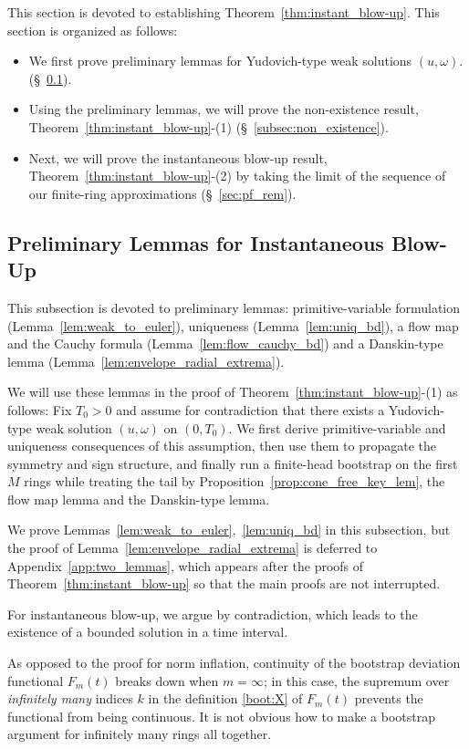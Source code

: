 \documentclass[reqno,11pt]{amsart}
\begin{document}
This section is devoted to establishing Theorem~\ref{thm:instant_blow-up}. 
This section is organized as follows:
\begin{itemize}
\item 
We first prove preliminary lemmas for Yudovich-type weak solutions \((u,\omega)\). (\S~\ref{sec:prel_lem}). 
\item Using the preliminary lemmas, we will prove the non-existence result, Theorem~\ref{thm:instant_blow-up}-(1)  (\S~\ref{subsec:non_existence}). 
\item Next, we will prove the instantaneous blow-up result, Theorem~\ref{thm:instant_blow-up}-(2) by taking the limit of the sequence of our finite-ring approximations (\S~\ref{sec:pf_rem}).
\end{itemize}


\subsection{Preliminary Lemmas for Instantaneous Blow-Up}
\label{sec:prel_lem}

This subsection is devoted to preliminary lemmas: primitive-variable formulation (Lemma~\ref{lem:weak_to_euler}), uniqueness (Lemma~\ref{lem:uniq_bd}), a flow map and the Cauchy formula (Lemma~\ref{lem:flow_cauchy_bd}) and a Danskin-type lemma (Lemma~\ref{lem:envelope_radial_extrema}).

We will use these lemmas in the proof of Theorem~\ref{thm:instant_blow-up}-(1) as follows: Fix $T_0>0$ and assume for contradiction that there exists a Yudovich-type weak solution $(u,\omega)$ on $(0,T_0)$. We first derive primitive-variable and uniqueness consequences of this assumption, then use them to propagate the symmetry and sign structure, and finally run a finite-head bootstrap on the first $M$ rings while treating the tail by Proposition~\ref{prop:cone_free_key_lem}, the flow map lemma and the Danskin-type lemma.

We prove Lemmas~\ref{lem:weak_to_euler},~\ref{lem:uniq_bd} in this subsection, but the proof of  Lemma~\ref{lem:envelope_radial_extrema} is deferred to Appendix~\ref{app:two_lemmas}, which appears after the proofs  of Theorem~\ref{thm:instant_blow-up} so that the main proofs are not interrupted.

For instantaneous blow-up, we argue by contradiction, which leads to the existence of a bounded solution in a time interval. 

As opposed to the proof for norm inflation, continuity of the bootstrap deviation functional $F_m(t)$ breaks down when $m=\infty$; in this case, the supremum over \emph{infinitely many} indices $k$ in the definition \eqref{boot:X} of $F_m(t)$ prevents the functional from being continuous. It is not obvious how to make a bootstrap argument for infinitely many rings all together.
\end{document}
